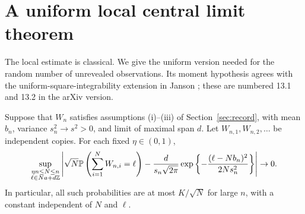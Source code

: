 \section{A uniform local central limit theorem}\label{sec:llt}
The local estimate is classical. We give the uniform version needed for the random number of unrevealed observations. Its moment hypothesis agrees with the uniform-square-integrability extension in Janson \cite[Lemma~14.1 and Remark~14.2]{Janson}; these are numbered 13.1 and 13.2 in the arXiv version.

\begin{lemma}\label{lem:llt}
Suppose that $W_n$ satisfies assumptions \textnormal{(i)--(iii)} of Section~\ref{sec:record}, with mean $b_n$, variance $s_n^2\to s^2>0$, and limit of maximal span $d$. Let $W_{n,1},W_{n,2},\ldots$ be independent copies. For each fixed $\eta\in(0,1)$,
\begin{equation}\label{eq:llt}
 \sup_{\substack{\eta n\le N\le n\\ \ell\in Na+d\mathbb Z}}
 \left|\sqrt N\mathbb P\left(\sum_{i=1}^{N}W_{n,i}=\ell\right)
 -\frac{d}{s_n\sqrt{2\pi}}
   \exp\left\{-\frac{(\ell-Nb_n)^2}{2Ns_n^2}\right\}\right|\to0.
\end{equation}
In particular, all such probabilities are at most $K/\sqrt N$ for large $n$, with a constant independent of $N$ and $\ell$.
\end{lemma}
